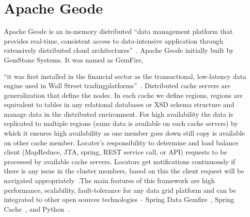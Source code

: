 \section{Apache Geode}

Apache Geode is an in-memory distributed ``data management platform
that provides real-time, consistent access to data-intensive
application through extensively distributed cloud
architectures''~\cite{hid-sp18-514-apachegeodewiki}. Apache Geode
initially built by GemStone Systems. It was named as GemFire, 

``it was
first installed in the financial sector as the transactional,
low-latency data engine used in Wall Street tradingplatforms''~\cite{hid-sp18-514-apachegeodewiki}.
Distributed cache servers are generalization that define the nodes. In
each cache we define regions, regions are equivalent to tables in any
relational databases or XSD schema structure and manage data in the
distributed environment. For high availability the data is replicated
to multiple regions (same data is available on each cache servers) by
which it ensures high availability as one member goes down still copy
is available on other cache member. Locater’s responsibility to
determine and load balance client (MapReduce, JTA, spring, REST service
call, or API) requests to be processed by available cache servers.
Locators get notifications continuously if there is any issue in the
cluster members, based on this the client request will be navigated
appropriately~\cite{hid-sp18-514-apachegeodewiki}.The main features of
this framework are high performance, scalability, fault-tolerance for
any data grid platform and can be integrated to other open sources
technologies – Spring Data
Gemfire~\cite{hid-sp18-514-geodespringgemfire}, Spring
Cache~\cite{hid-sp18-514-geodespringcache}, and
Python~\cite{hid-sp18-514-geodepython}.
